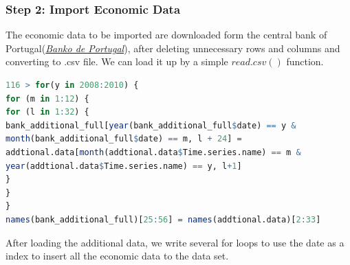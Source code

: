 \documentclass[12pt, a4paper, bibliography=totoc, english]{scrartcl}
\begin{document}
\subsubsection{Step 2: Import Economic Data}
The economic data to be imported are downloaded form the central bank of Portugal(\href{https://www.bportugal.pt/EstatisticasWeb/(S(gsunqi45gmyt5z453bo5l555))/Default.aspx?Lang=en-GB}{\emph{Banko de Portugal}}), after deleting unnecessary rows and columns and converting to .csv file. We can load it up by a simple $read.csv()$ function.
\begin{lstlisting}[language = R]
116 > for(y in 2008:2010) {
for (m in 1:12) {
for (l in 1:32) {
bank_additional_full[year(bank_additional_full$date) == y &
month(bank_additional_full$date) == m, l + 24] =
addtional.data[month(addtional.data$Time.series.name) == m &
year(addtional.data$Time.series.name) == y, l+1]
}
} 
}
names(bank_additional_full)[25:56] = names(addtional.data)[2:33]
\end{lstlisting}
After loading the additional data, we write several for loops to use the date as a index to insert all the economic data to the data set.
\end{document}
